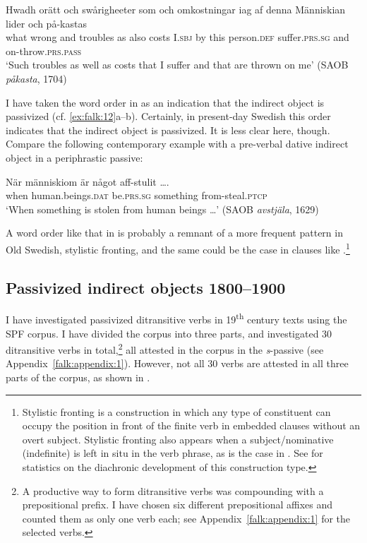 \documentclass[output=paper]{langscibook}
\begin{document}
\ex\label{ex:falk:17d}
\gll Hwadh  orätt    och  swårigheeter  som  och  omkostningar  iag    af  denna Människian    lider          och  på-kastas\\
what    wrong  and  troubles       as     also  costs          I.\textsc{sbj}  by  this            person.\textsc{def}    suffer.\textsc{prs.sg}    and  on-throw.\textsc{prs}.\textsc{pass}\\
\glt ‘Such troubles as well as costs that I suffer and that are thrown on   me’ {(SAOB \textit{påkasta}, 1704)}
\z
\z

I have taken the word order in  as an indication that the indirect object is passivized (cf. \ref{ex:falk:12}a–b). Certainly, in present-day Swedish this order indicates that the indirect object is passivized. It is less clear here, though. Compare the following contemporary example with a pre-verbal dative indirect object in a periphrastic passive:\largerpage

\ea%
    \label{ex:falk:18}
\gll När  människiom      är        något      aff-stulit …. \\
    when  human.beings\textsc{.dat}  be.\textsc{prs.sg}  something  from-steal.\textsc{ptcp}\\
\glt ‘When something is stolen from human beings …’ (SAOB \textit{avstjäla}, 1629)
\z


A word order like that in  is probably a remnant of a more frequent pattern in Old Swedish, stylistic fronting, and the same could be the case in clauses like .\footnote{Stylistic fronting is a construction in which any type of constituent can occupy the position in front of the finite verb in embedded clauses without an overt subject. Stylistic fronting also appears when a subject/nominative (indefinite) is left in situ in the verb phrase, as is the case in . See \citet[326]{Falk1993} for statistics on the diachronic development of this construction type.}

\subsection{Passivized indirect objects 1800–1900}\label{sec:falk:3.5}


I have investigated passivized ditransitive verbs in 19\textsuperscript{th} century texts using the SPF corpus. I have divided the corpus into three parts, and investigated 30 ditransitive verbs in total,\footnote{A productive way to form ditransitive verbs was compounding with a prepositional prefix. I have chosen six different prepositional affixes and counted them as only one verb each; see Appendix~\ref{falk:appendix:1} for the selected verbs.\label{fn:02:15}} all attested in the corpus in the \textit{s}{}-passive (see Appendix~\ref{falk:appendix:1}). However, not all 30 verbs are attested in all three parts of the corpus, as shown in .
\end{document}

